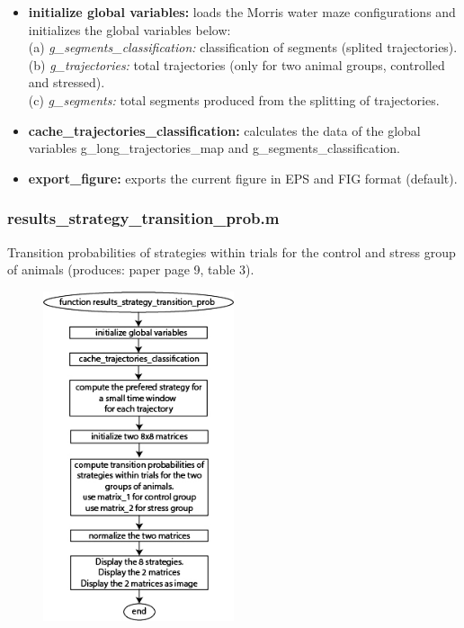 \documentclass[12pt,titlepage]{article}
\begin{document}
\begin{doublespace}
\begin{itemize}
	\item\textbf{initialize global variables:} loads the Morris water maze configurations and initializes the global variables below:\\
	(a) \textit{g\_segments\_classification:} classification of segments (splited trajectories).\\
	(b) \textit{g\_trajectories:} total trajectories (only for two animal groups, controlled and stressed).\\
	(c) \textit{g\_segments:} total segments produced from the splitting of trajectories.
	\item\textbf{cache\_trajectories\_classification:}  calculates the data of the global variables g\_long\_trajectories\_map and g\_segments\_classification.
	\item\textbf{export\_figure:} exports the current figure in EPS and FIG format (default).
\end{itemize}

\subsubsection{results\_strategy\_transition\_prob.m}
Transition probabilities of strategies within trials for the control and stress group of animals (produces: paper page 9, table 3).

\begin{figure}[H]
	\begin{center}
		\includegraphics[width=0.5\textwidth]{diagram_strategy_transition_prob.jpg}
		\label{table3}
	\end{center}
\end{figure}


\end{doublespace}
\end{document}
